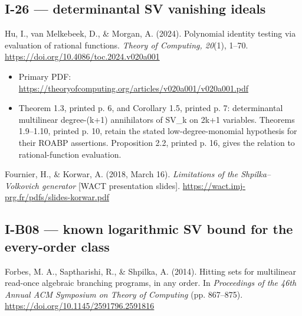 \documentclass[11pt,a4paper]{article}
\providecommand{\tightlist}{\setlength{\itemsep}{0pt}\setlength{\parskip}{0pt}}
\theoremstyle{definition}\newtheorem{definition}{Definition}
\begin{document}
\subsection{I-26 --- determinantal SV vanishing
ideals}\label{i-26--determinantal-sv-vanishing-ideals}

Hu, I., van Melkebeek, D., \& Morgan, A. (2024). Polynomial identity
testing via evaluation of rational functions. \emph{Theory of Computing,
20}(1), 1--70. \url{https://doi.org/10.4086/toc.2024.v020a001}

\begin{itemize}
\tightlist
\item
  Primary PDF:
  \url{https://theoryofcomputing.org/articles/v020a001/v020a001.pdf}
\item
  Theorem 1.3, printed p. 6, and Corollary 1.5, printed p. 7:
  determinantal multilinear degree-(k+1) annihilators of SV\_k on 2k+1
  variables. Theorems 1.9--1.10, printed p. 10, retain the stated
  low-degree-monomial hypothesis for their ROABP assertions. Proposition
  2.2, printed p. 16, gives the relation to rational-function
  evaluation.
\end{itemize}

Fournier, H., \& Korwar, A. (2018, March 16). \emph{Limitations of the
Shpilka--Volkovich generator} {[}WACT presentation slides{]}.
\url{https://wact.imj-prg.fr/pdfs/slides-korwar.pdf}

\subsection{I-B08 --- known logarithmic SV bound for the every-order
class}\label{i-b08--known-logarithmic-sv-bound-for-the-every-order-class}

Forbes, M. A., Saptharishi, R., \& Shpilka, A. (2014). Hitting sets for
multilinear read-once algebraic branching programs, in any order. In
\emph{Proceedings of the 46th Annual ACM Symposium on Theory of
Computing} (pp. 867--875). \url{https://doi.org/10.1145/2591796.2591816}
\end{document}
